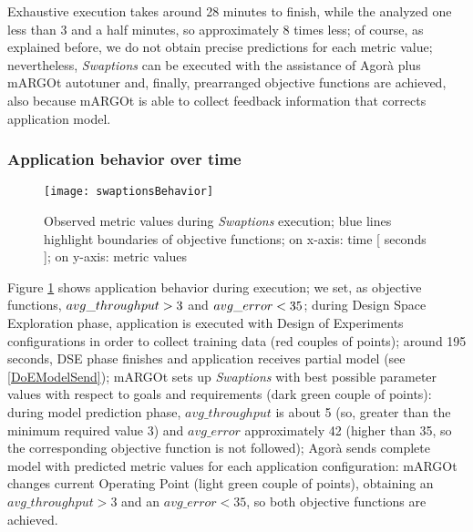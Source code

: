 Exhaustive execution takes around 28 minutes to finish, while the analyzed one less than 3 and a half minutes, so approximately 8 times less; of course, as explained before, we do not obtain precise predictions for each metric value; nevertheless, \textit{Swaptions} can be executed with the assistance of Agorà plus mARGOt autotuner and, finally, prearranged objective functions are achieved, also because mARGOt is able to collect feedback information that corrects application model.


\subsubsection{Application behavior over time}

\begin{figure}[H]

    \centering
    
    \texttt{[image: swaptionsBehavior]}
    
    \caption{Observed metric values during \textit{Swaptions} execution; blue lines highlight boundaries of objective functions; on x-axis: time [ seconds ]; on y-axis: metric values}
    
    \label{fig::sw::beh}
    
\end{figure}

Figure \ref{fig::sw::beh} shows application behavior during execution; we set, as objective functions, $avg\_\-throughput > 3$ and $avg\_\-error < 35$; during Design Space Exploration phase, application is executed with Design of Experiments configurations in order to collect training data (red couples of points); around 195 seconds, DSE phase finishes and application receives partial model (see \ref{DoEModelSend}); mARGOt sets up \textit{Swaptions} with best possible parameter values with respect to goals and requirements (dark green couple of points): during model prediction phase, $avg\_throughput$ is about 5 (so, greater than the minimum required value 3) and $avg\_error$ approximately 42 (higher than 35, so the corresponding objective function is not followed); Agorà sends complete model with predicted metric values for each application configuration: mARGOt changes current Operating Point (light green couple of points), obtaining an $avg\_throughput > 3$ and an $avg\_error < 35$, so both objective functions are achieved. 
